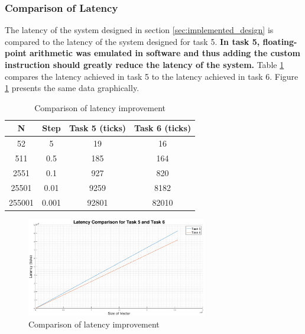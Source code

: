 \documentclass{article}
\begin{document}
\subsubsection{Comparison of Latency}\label{sec:compare_latency_6}
The latency of the system designed in section \ref{sec:implemented_design} is compared to the latency of the system designed for task 5. \textbf{In task 5, floating-point arithmetic was emulated in software and thus adding the custom instruction should greatly reduce the latency of the system.} Table \ref{tab:task6_latency} compares the latency achieved in task 5 to the latency achieved in task 6. Figure \ref{fig:task6_latency_graph} presents the same data graphically.


\begin{table}[H]
  \centering
    \begin{tabular}{|c|c|c|c|}
    \hline
    \textbf{N} & \textbf{Step} & \textbf{Task 5 (ticks)} & \textbf{Task 6 (ticks)} \\
    \hline
    52    & 5     & 19    & 16 \\
    \hline
    511   & 0.5   & 185   & 164 \\
    \hline
    2551  & 0.1   & 927   & 820 \\
    \hline
    25501 & 0.01  & 9259  & 8182 \\
    \hline
    255001 & 0.001 & 92801 & 82010 \\
    \hline
    \end{tabular}%
  \caption{Comparison of latency improvement}
  \label{tab:task6_latency}%
\end{table}%


\begin{figure}[H]
    \centering
    \includegraphics[width=0.7\textwidth]{task_6_latency}
    \caption{Comparison of latency improvement}
    \label{fig:task6_latency_graph}
\end{figure}
\end{document}
